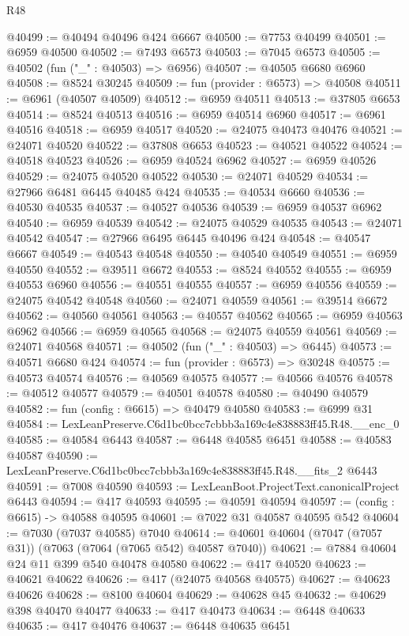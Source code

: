 \begin{lexlean}{R48}
\begin{coremodule}
@40499 := @40494 @40496 @424 @6667
@40500 := @7753 @40499
@40501 := @6959 @40500
@40502 := @7493 @6573
@40503 := @7045 @6573
@40505 := @40502 (fun ("_" : @40503) => @6956)
@40507 := @40505 @6680 @6960
@40508 := @8524 @30245
@40509 := fun (provider : @6573) => @40508
@40511 := @6961 (@40507 @40509)
@40512 := @6959 @40511
@40513 := @37805 @6653
@40514 := @8524 @40513
@40516 := @6959 @40514 @6960
@40517 := @6961 @40516
@40518 := @6959 @40517
@40520 := @24075 @40473 @40476
@40521 := @24071 @40520
@40522 := @37808 @6653
@40523 := @40521 @40522
@40524 := @40518 @40523
@40526 := @6959 @40524 @6962
@40527 := @6959 @40526
@40529 := @24075 @40520 @40522
@40530 := @24071 @40529
@40534 := @27966 @6481 @6445 @40485 @424
@40535 := @40534 @6660
@40536 := @40530 @40535
@40537 := @40527 @40536
@40539 := @6959 @40537 @6962
@40540 := @6959 @40539
@40542 := @24075 @40529 @40535
@40543 := @24071 @40542
@40547 := @27966 @6495 @6445 @40496 @424
@40548 := @40547 @6667
@40549 := @40543 @40548
@40550 := @40540 @40549
@40551 := @6959 @40550
@40552 := @39511 @6672
@40553 := @8524 @40552
@40555 := @6959 @40553 @6960
@40556 := @40551 @40555
@40557 := @6959 @40556
@40559 := @24075 @40542 @40548
@40560 := @24071 @40559
@40561 := @39514 @6672
@40562 := @40560 @40561
@40563 := @40557 @40562
@40565 := @6959 @40563 @6962
@40566 := @6959 @40565
@40568 := @24075 @40559 @40561
@40569 := @24071 @40568
@40571 := @40502 (fun ("_" : @40503) => @6445)
@40573 := @40571 @6680 @424
@40574 := fun (provider : @6573) => @30248
@40575 := @40573 @40574
@40576 := @40569 @40575
@40577 := @40566 @40576
@40578 := @40512 @40577
@40579 := @40501 @40578
@40580 := @40490 @40579
@40582 := fun (config : @6615) => @40479 @40580
@40583 := @6999 @31
@40584 := LexLeanPreserve.C6d1bc0bcc7cbbb3a169c4e838883ff45.R48.__enc_0
@40585 := @40584 @6443
@40587 := @6448 @40585 @6451
@40588 := @40583 @40587
@40590 := LexLeanPreserve.C6d1bc0bcc7cbbb3a169c4e838883ff45.R48.__fits_2 @6443
@40591 := @7008 @40590
@40593 := LexLeanBoot.ProjectText.canonicalProject @6443
@40594 := @417 @40593
@40595 := @40591 @40594
@40597 := (config : @6615) -> @40588 @40595
@40601 := @7022 @31 @40587 @40595 @542
@40604 := @7030 (@7037 @40585) @7040
@40614 := @40601 @40604 (@7047 (@7057 @31)) (@7063 (@7064 (@7065 @542) @40587 @7040))
@40621 := @7884 @40604 @24 @11 @399 @540 @40478 @40580
@40622 := @417 @40520
@40623 := @40621 @40622
@40626 := @417 (@24075 @40568 @40575)
@40627 := @40623 @40626
@40628 := @8100 @40604
@40629 := @40628 @45
@40632 := @40629 @398 @40470 @40477
@40633 := @417 @40473
@40634 := @6448 @40633
@40635 := @417 @40476
@40637 := @6448 @40635 @6451

\end{coremodule}
\end{lexlean}
